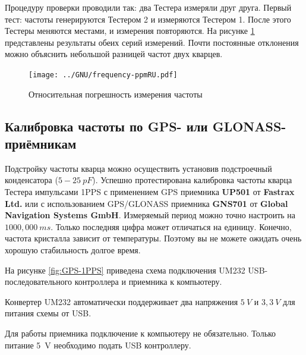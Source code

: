 Процедуру проверки проводили так: два Тестера измеряли друг друга. Первый тест: частоты генерируются 
Тестером 2 и измеряются Тестером 1. После этого Тестеры меняются местами, и измерения повторяются. 
На рисунке \ref{fig:freq-ppm} представлены результаты обеих серий измерений. Почти постоянные 
отклонения можно объяснить небольшой разницей частот двух кварцев.

\begin{figure}[H]
\centering
\texttt{[image: ../GNU/frequency-ppmRU.pdf]}
\caption{Относительная погрешность измерения частоты}
\label{fig:freq-ppm}
\end{figure}

\subsection{Калибровка частоты по GPS- или GLONASS-приёмникам}

Подстройку частоты кварца можно осуществить установив подстроечный конденсатора (\(5-25~pF\)).
Успешно протестирована калибровка частоты кварца Тестера импульсами 1PPS с применением GPS приемника 
\textbf{ UP501} от \textbf{ Fastrax Ltd.} или с использованием GPS/GLONASS приемника \textbf{ GNS701} от \textbf{ Global 
Navigation Systems GmbH}.
Измеряемый период можно точно настроить на \(1000,000~ms\).
Только последняя цифра может отличаться на единицу.
Конечно, частота кристалла зависит от температуры. Поэтому вы не можете ожидать очень хорошую стабильность 
долгое время.

На рисунке \ref{fig:GPS-1PPS} приведена схема подключения UM232 USB-последовательного контроллера и
приемника к компьютеру.

Конвертер UM232 автоматически поддерживает два напряжения \(5~V\) и \(3,3~V\) 
для питания схемы от USB. 

Для работы приемника подключение к компьютеру не обязательно. 
Только питание 5~V необходимо подать USB контроллеру. 


